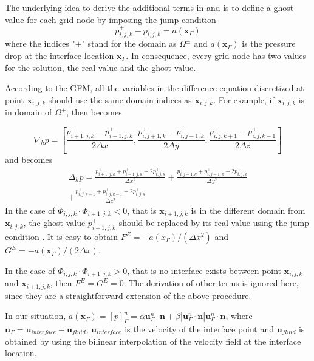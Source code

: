 The underlying idea to derive the additional terms in  and
 is to define a ghost value for each grid node by imposing the jump
condition
\begin{equation} p_{i,j,k}^+ - p_{i,j,k}^- = a(\mathbf{x}_{\Gamma})
\label{disJump} \end{equation} where the indices "$\pm$" stand for the domain as
$\Omega^{\pm}$ and $a(\mathbf{x}_{\Gamma})$ is the pressure drop at the
interface location $\mathbf{x}_{\Gamma}$.  In consequence, every grid node has
two values for the solution, the real value and the ghost value.

According to the GFM, all the variables in the difference equation discretized
at point $\mathbf{x}_{i,j,k}$ should use the same domain indices as $\mathbf{x}_{i,j,k}$.
For example, if $\mathbf{x}_{i,j,k}$ is in domain of $\Omega^+$, then  becomes

\begin{equation} \label{ghostGradP} \nabla_h p =
[\frac{p^+_{i+1,j,k}-p^+_{i-1,j,k}}{2\Delta x},
\frac{p^+_{i,j+1,k}-p^+_{i,j-1,k}}{2\Delta y},
\frac{p^+_{i,j,k+1}-p^+_{i,j,k-1}}{2\Delta z}] \end{equation} and 
becomes
\begin{equation} \label{ghostLapP} 
\begin{aligned}
\Delta_h p =
\frac{p^+_{i+1,j,k}+p^+_{i-1,j,k}-2p^+_{i,j,k}}{\Delta x^2} +
\frac{p^+_{i,j+1,k}+p^+_{i,j-1,k}-2p^+_{i,j,k}}{\Delta y^2} \\
+\frac{p^+_{i,j,k+1}+p^+_{i,j,k-1}-2p^+_{i,j,k}}{\Delta z^2} \end{aligned}
\end{equation}
In the case of $\Phi_{i,j,k} \cdot \Phi_{i+1,j,k} < 0$, that is
$\mathbf{x}_{i+1,j,k}$ is in the different domain from $\mathbf{x}_{i,j,k}$,
the ghost value $p^+_{i+1,j,k}$ should be replaced by its real value using the
jump condition . It is easy to obtain
$F^E = -a(x_{\Gamma})/(\Delta x^2)$ and $G^E = -a(\mathbf{x}_{\Gamma})/(2\Delta x)$.

In the case of $\Phi_{i,j,k}\cdot\Phi_{i+1,j,k} > 0$, that is no interface exists between point $\mathbf{x}_{i,j,k}$ and $\mathbf{x}_{i+1,j,k}$, then $F^E = G^E = 0$.  The derivation of other terms is ignored here, since they are a straightforward extension of the above procedure.

In our situation, $a(\mathbf{x}_{\Gamma}) = [p]^n_{\Gamma} = \alpha
\mathbf{u}_{\Gamma}^n\cdot \mathbf{n} + \beta|\mathbf{u}_{\Gamma}^n\cdot
\mathbf{n}| \mathbf{u}_{\Gamma}^n\cdot \mathbf{n}$, where $\mathbf{u}_{\Gamma} =
\mathbf{u}_{interface} - \mathbf{u}_{fluid}$, $\mathbf{u}_{interface}$ is the
velocity of the interface point and $\mathbf{u}_{fluid}$ is obtained by using
the bilinear interpolation of the velocity field at the interface location.

